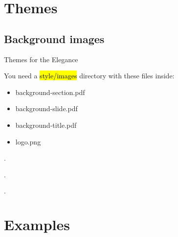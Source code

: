 





\maketitle


\section{Themes}

\subsection{Background images}

\begin{xframe}{Themes for the Elegance}

    You need a \hl{style/images} directory
    with these files inside:

    \begin{itemize}
        \item background-section.pdf
        \item background-slide.pdf
        \item background-title.pdf
        \item logo.png
    \end{itemize}

\end{xframe}


{
\begin{frame}[plain]
    .
\end{frame}
}


{
\begin{frame}[plain]
    .
\end{frame}
}


{
\begin{frame}[plain]
    .
\end{frame}
}





\section{Examples}

